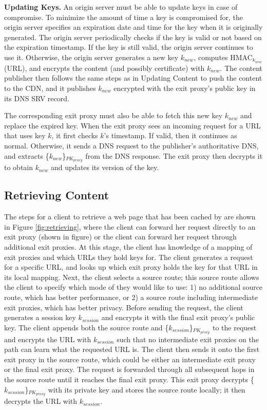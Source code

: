\textbf{Updating Keys.}
An origin server must be able to update keys in case of compromise.  To minimize the amount of time a key is compromised for, the 
origin server specifies an expiration date and time for the key when it is originally generated.  The origin server 
periodically checks if the key is valid or not based on the expiration timestamp.  If the key is still valid, the origin server 
continues to use it.  Otherwise, the origin server generates a new key $k_{new}$, computes HMAC$_{k_{new}}$(URL), and 
encrypts the content (and possibly certificate) with $k_{new}$.  The content publisher then follows the same steps as in Updating 
Content to push the content to the CDN, and it publishes $k_{new}$ encrypted with the exit proxy's public key in its DNS SRV record.

The corresponding exit proxy must also be able to fetch this new key $k_{new}$ and replace the expired key.  When the exit proxy 
sees an incoming request for a URL that uses key $k$, it first checks $k$'s timestamp.  If valid, then it continues as normal.  Otherwise, 
it sends a DNS request to the publisher's authoritative DNS, and extracts \{$k_
{new}$\}$_{PK_{proxy}}$ from the DNS response.  The exit 
proxy then decrypts it to obtain $k_{new}$ and updates its version of the key.




\subsection{Retrieving Content}
\label{sec:retrieve}
The steps for a client to retrieve a web page that has been cached by \system{} are shown in Figure \ref{fig:retrieving}, where the client 
can forward her request directly to an exit proxy (shown in figure) or the client can forward her
request through additional exit proxies. At this 
stage, the client has knowledge of a mapping of exit proxies and which URLs they hold 
keys for.  The client generates a request for a specific URL, and looks up which exit proxy holds the key for that URL in its local mapping.  Next, 
the client selects a source route; this source route allows the client to specify which mode of \system{} they would like to use: 1) no additional source 
route, which has better performance, or 2) a source route including intermediate exit proxies, which has better privacy. Before sending the request, the client generates a session key $k_{session}$ and encrypts it with the final exit proxy's public key.  The client appends both the source route and \{$k_{session}$\}$_{PK_{proxy}}$ to the request and encrypts the URL with $k_{session}$ such that no intermediate exit proxies on the path can learn what the requested URL is.  The client then sends it onto the first exit proxy in the source route, which could be either an intermediate exit proxy or the final exit proxy.  The request is forwarded 
through all subsequent hops in the source route until it reaches the final exit proxy.  This exit proxy decrypts \{$k_{session}$\}$_{PK_{proxy}}$ with its private key and stores 
the source route locally; it then decrypts the URL with $k_{session}$. 

